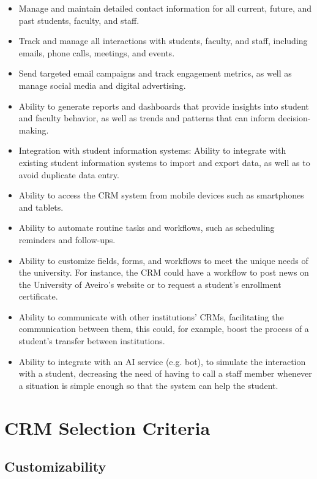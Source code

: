 \documentclass{article}
\begin{document}
\begin{itemize}

    \item Manage and maintain detailed contact information for all current, future, and past students, faculty, and staff.
    \item Track and manage all interactions with students, faculty, and staff, including emails, phone calls, meetings, and events.
    \item Send targeted email campaigns and track engagement metrics, as well as manage social media and digital advertising.
    \item Ability to generate reports and dashboards that provide insights into student and faculty behavior, as well as trends and patterns that can inform decision-making.
    \item Integration with student information systems: Ability to integrate with existing student information systems to import and export data, as well as to avoid duplicate data entry.
    \item Ability to access the CRM system from mobile devices such as smartphones and tablets.
    \item Ability to automate routine tasks and workflows, such as scheduling reminders and follow-ups. 
    \item Ability to customize fields, forms, and workflows to meet the unique needs of the university. For instance, the CRM could have a workflow to post news on the University of Aveiro's website or to request a student's enrollment certificate.
    \item Ability to communicate with other institutions' CRMs, facilitating the communication between them, this could, for example, boost the process of a student's transfer between institutions.
    \item Ability to integrate with an AI service (e.g. bot), to simulate the interaction with a student, decreasing the need of having to call a staff member whenever a situation is simple enough so that the system can help the student.

\end{itemize}


\section{CRM Selection Criteria}

\subsection{Customizability}
\end{document}
